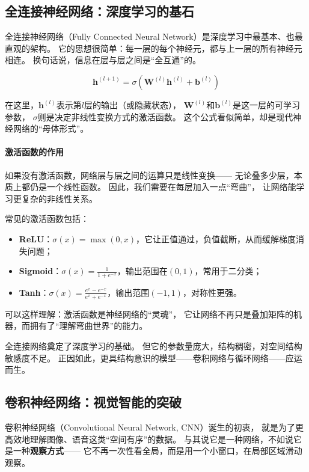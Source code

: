 \subsection{全连接神经网络：深度学习的基石}

全连接神经网络（Fully Connected Neural Network）是深度学习中最基本、也最直观的架构。  
它的思想很简单：每一层的每个神经元，都与上一层的所有神经元相连。  
换句话说，信息在层与层之间是“全互通”的。

$$\mathbf{h}^{(l+1)} = \sigma(\mathbf{W}^{(l)} \mathbf{h}^{(l)} + \mathbf{b}^{(l)})$$

在这里，$\mathbf{h}^{(l)}$表示第$l$层的输出（或隐藏状态），  
$\mathbf{W}^{(l)}$和$\mathbf{b}^{(l)}$是这一层的可学习参数，  
$\sigma$则是决定非线性变换方式的激活函数。  
这个公式看似简单，却是现代神经网络的“母体形式”。

\paragraph{激活函数的作用}  
如果没有激活函数，网络层与层之间的运算只是线性变换——  
无论叠多少层，本质上都仍是一个线性函数。  
因此，我们需要在每层加入一点“弯曲”，  
让网络能学习更复杂的非线性关系。  

常见的激活函数包括：

\begin{itemize}
\item \textbf{ReLU}：$\sigma(x) = \max(0, x)$，它让正值通过，负值截断，从而缓解梯度消失问题；
\item \textbf{Sigmoid}：$\sigma(x) = \frac{1}{1+e^{-x}}$，输出范围在$(0,1)$，常用于二分类；
\item \textbf{Tanh}：$\sigma(x) = \frac{e^x - e^{-x}}{e^x + e^{-x}}$，输出范围$(-1,1)$，对称性更强。
\end{itemize}

可以这样理解：激活函数是神经网络的“灵魂”，  
它让网络不再只是叠加矩阵的机器，而拥有了“理解弯曲世界”的能力。

全连接网络奠定了深度学习的基础。  
但它的参数量庞大，结构稠密，对空间结构敏感度不足。  
正因如此，更具结构意识的模型——卷积网络与循环网络——应运而生。

\subsection{卷积神经网络：视觉智能的突破}

卷积神经网络（Convolutional Neural Network, CNN）诞生的初衷，  
就是为了更高效地理解图像、语音这类“空间有序”的数据。  
与其说它是一种网络，不如说它是一种\textbf{观察方式}——  
它不再一次性看全局，而是用一个小窗口，在局部区域滑动观察。

